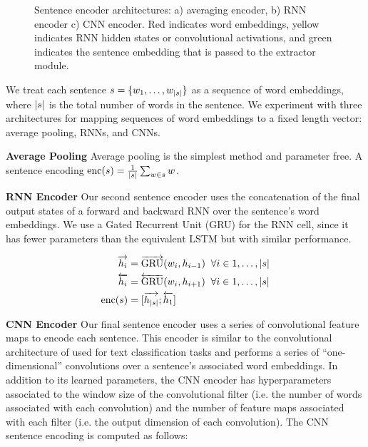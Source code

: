 \begin{figure}
  \caption{Sentence encoder architectures: a) averaging encoder, b) RNN encoder
           c) CNN encoder. Red indicates word embeddings, yellow indicates
           RNN hidden states or convolutional activations, and green 
           indicates the sentence embedding that is passed to the extractor
           module.}
    \label{fig:encoders}
\end{figure}



We treat each sentence $s = \{w_1, \ldots, w_{|s|}\}$ 
as a sequence of word embeddings, where $|s|$ is the total number of words
in the sentence. We experiment with three architectures for mapping sequences
of word embeddings to a fixed length vector: average pooling, RNNs, and CNNs.

\textbf{Average Pooling} Average pooling is the simplest method and parameter
free. A sentence encoding $\operatorname{enc}(s) = 
\frac{1}{|s|} \sum_{w \in s} w$.

\textbf{RNN Encoder} Our second sentence encoder uses the concatenation of the
final output states of a forward and backward RNN over the sentence's word
embeddings. We use a Gated Recurrent Unit (GRU) \cite{cho} for the RNN cell,
since it has fewer parameters than the equivalent LSTM but with similar 
performance.

\begin{align} 
    \overrightarrow{h_i} &= \overrightarrow{\operatorname{GRU}}(w_i, h_{i-1}) \;\; \forall i \in 1, \ldots, |s| \\
    \overleftarrow{h_i} &= \overleftarrow{\operatorname{GRU}}(w_i, h_{i+1})  \;\; \forall i \in 1, \ldots, |s| \\
    \operatorname{enc}(s) &= [\overrightarrow{h_{|s|}} ; \overleftarrow{h_1} ] 
\end{align}

\textbf{CNN Encoder} Our final sentence encoder uses a series of 
convolutional feature maps to encode each sentence. This encoder is similar
to the convolutional architecture of \cite{kim} used for text classification
tasks and performs a series of ``one-dimensional'' convolutions over 
a sentence's associated word embeddings. 
In addition to its learned parameters, the CNN encoder has hyperparameters
associated to the window size of the convolutional filter 
(i.e. the number of words associated with each convolution) and the number of 
feature maps associated with each filter (i.e. the output dimension of each 
convolution). The CNN sentence encoding is computed as follows:

